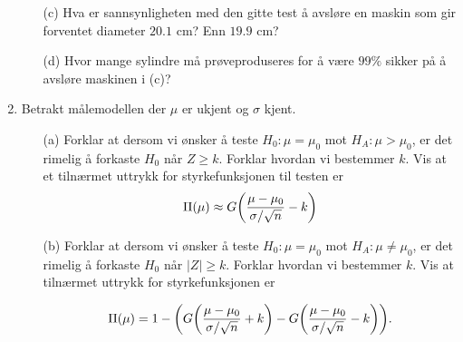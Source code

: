 \begin{enumerate}
\begin{itemize}
  \item[(c)]  Hva er sannsynligheten med den gitte test å
               avsløre en maskin som gir forventet diameter
               $20.1$ cm? Enn $19.9$ cm?
  \item[(d)]  Hvor mange sylindre må prøveproduseres for
               å være $99\%$ sikker på å
               avsløre maskinen i (c)?
 \end{itemize}
\item     Betrakt målemodellen der $\mu$ er ukjent og
          $\sigma$ kjent.
 \begin{itemize}
  \item[(a)]  Forklar at dersom vi ønsker å teste
               $ H_0:\mu={\mu}_0 $  mot $ H_A: \mu> {\mu}_0 $,
               er det rimelig å forkaste $H_0$ når $Z\ge
               k$. Forklar hvordan vi bestemmer $k$. Vis at et
               tilnærmet uttrykk for styrkefunksjonen til
               testen er
               \[\Pi(\mu)\approx G\biggl({\mu - {\mu}_0\over
               \sigma / \sqrt n} - k\biggr)\]
  \item[(b)]  Forklar at dersom vi ønsker å teste
               $ H_0:\mu={\mu}_0 $ mot $ H_A:\mu\not ={\mu}_0 $,
               er det rimelig å forkaste $H_0$ når $\mid
               Z\mid \ge k$. Forklar hvordan vi bestemmer $k$.
               Vis at tilnærmet uttrykk for styrkefunksjonen
               er

               \[\Pi (\mu)=1 - \biggl(G\biggl({\mu -{\mu}_0\over
               \sigma / \sqrt n} + k\biggr) - G\biggl({\mu -
               {\mu}_0\over\sigma / \sqrt n} - k\biggr)\biggr).\]


\end{itemize}
\end{enumerate}
